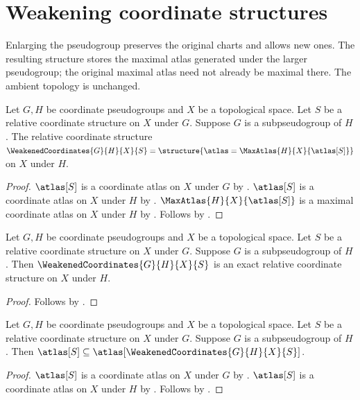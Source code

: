 \section{Weakening coordinate structures}



Enlarging the pseudogroup preserves the original charts and allows new ones.
The resulting structure stores the maximal atlas generated under the larger
pseudogroup; the original maximal atlas need not already be maximal there.
The ambient topology is unchanged.

\begin{construction}\label{weakened_coordinates}
    Let $G,H$ be coordinate pseudogroups and $X$ be a topological space.
    Let $S$ be a relative coordinate structure on $X$ under $G$.
    Suppose $G$ is a subpseudogroup of $H$.
    The relative coordinate structure $\WeakenedCoordinates{G}{H}{X}{S}=
        \structure{\atlas=\MaxAtlas{H}{X}{\atlas[S]}}$ on $X$ under $H$.
\end{construction}
\begin{proof}
    $\atlas[S]$ is a coordinate atlas on $X$ under $G$ by
        .
    $\atlas[S]$ is a coordinate atlas on $X$ under $H$ by .
    $\MaxAtlas{H}{X}{\atlas[S]}$ is a maximal coordinate atlas on $X$ under $H$ by
        .
    Follows by .
\end{proof}

\begin{theorem}\label{weakened_coordinates_is_exact}
    Let $G,H$ be coordinate pseudogroups and $X$ be a topological space.
    Let $S$ be a relative coordinate structure on $X$ under $G$.
    Suppose $G$ is a subpseudogroup of $H$.
    Then $\WeakenedCoordinates{G}{H}{X}{S}$ is an exact relative coordinate structure
        on $X$ under $H$.
\end{theorem}
\begin{proof}
    Follows by .
\end{proof}

\begin{theorem}\label{weakened_coordinates_chart_inclusion}
    Let $G,H$ be coordinate pseudogroups and $X$ be a topological space.
    Let $S$ be a relative coordinate structure on $X$ under $G$.
    Suppose $G$ is a subpseudogroup of $H$.
    Then $\atlas[S]\subseteq\atlas[\WeakenedCoordinates{G}{H}{X}{S}]$.
\end{theorem}
\begin{proof}
    $\atlas[S]$ is a coordinate atlas on $X$ under $G$ by
        .
    $\atlas[S]$ is a coordinate atlas on $X$ under $H$ by .
    Follows by .
\end{proof}

